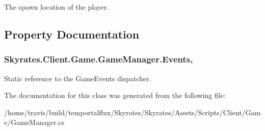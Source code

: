 The spawn location of the player. 



\subsection{Property Documentation}
\hypertarget{class_skyrates_1_1_client_1_1_game_1_1_game_manager_a0fe4743cbadedfc0ad93d51534f3d339}{
\subsubsection[{Events}]{ Skyrates.\-Client.\-Game.\-Game\-Manager.\-Events\hspace{0.3cm}{\ttfamily [static]}, {\ttfamily [get]}}}\label{class_skyrates_1_1_client_1_1_game_1_1_game_manager_a0fe4743cbadedfc0ad93d51534f3d339}


Static reference to the Game\-Events dispatcher. 



The documentation for this class was generated from the following file\-:\begin{DoxyCompactItemize}
\item 
/home/travis/build/temportalflux/\-Skyrates/\-Skyrates/\-Assets/\-Scripts/\-Client/\-Game/Game\-Manager.\-cs\end{DoxyCompactItemize}
